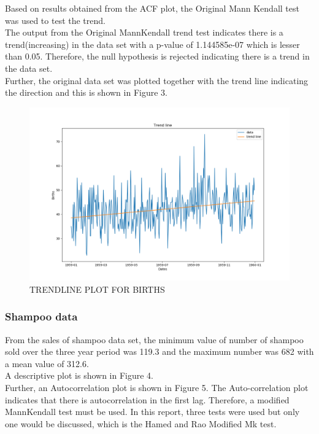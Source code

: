 \documentclass[12pt, letterpaper, twoside]{article}
\begin{document}
Based on results obtained from the ACF plot, the Original Mann Kendall test was used to test the trend.\\The output from the Original MannKendall trend test indicates there is a trend(increasing) in the data set with a p-value of 1.144585e-07 which is lesser than 0.05. Therefore, the null hypothesis is rejected indicating there is a trend in the data set.\\ Further, the original data set was plotted together with the trend line indicating the direction and this is shown in Figure 3.

\begin{figure}[bp!]                                                                                                                                                                      \centering                                                                                                                                                                  \includegraphics[width=1\textwidth]{Birth_data_Trendline.png}                                                                                                                \caption{TRENDLINE PLOT FOR BIRTHS}                                                                                                                                         \label{fig:1.1}                                                                                                                                 \end{figure} 

\subsubsection{Shampoo data}
From the sales of shampoo data set, the minimum value of number of shampoo sold over the three year period was 119.3 and the maximum number was 682 with a mean value of 312.6.\\ A descriptive plot is shown in Figure 4.\\ Further, an Autocorrelation plot is shown in Figure 5. The Auto-correlation plot indicates that there is autocorrelation in the first lag. Therefore, a modified MannKendall test must be used. In this report, three tests were used but only one would be discussed, which is the Hamed and Rao Modified Mk test.
\end{document}
